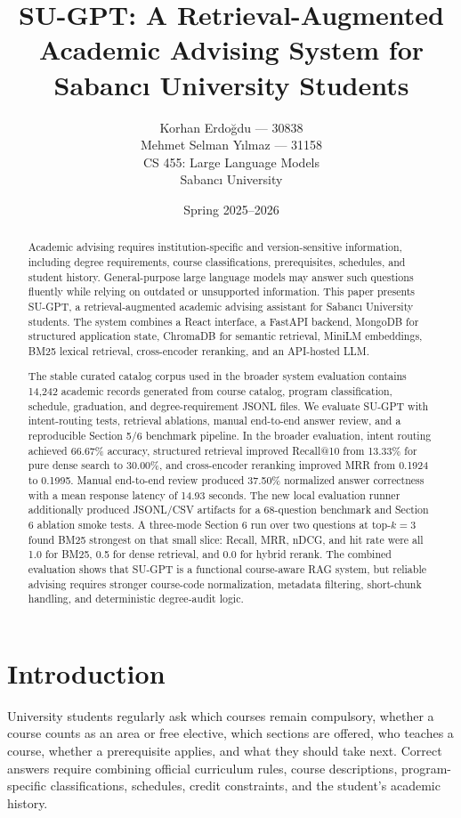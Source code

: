 \documentclass[10pt,a4paper]{article}
\title{\textbf{SU-GPT: A Retrieval-Augmented Academic Advising System for Sabancı University Students}}
\author{
    Korhan Erdoğdu --- 30838\\
    Mehmet Selman Yılmaz --- 31158\\[4pt]
    CS 455: Large Language Models\\
    Sabancı University
}
\date{Spring 2025--2026}
\begin{document}
\maketitle

\begin{abstract}
Academic advising requires institution-specific and version-sensitive information, including degree requirements, course classifications, prerequisites, schedules, and student history. General-purpose large language models may answer such questions fluently while relying on outdated or unsupported information. This paper presents SU-GPT, a retrieval-augmented academic advising assistant for Sabancı University students. The system combines a React interface, a FastAPI backend, MongoDB for structured application state, ChromaDB for semantic retrieval, MiniLM embeddings, BM25 lexical retrieval, cross-encoder reranking, and an API-hosted LLM.

The stable curated catalog corpus used in the broader system evaluation contains 14,242 academic records generated from course catalog, program classification, schedule, graduation, and degree-requirement JSONL files. We evaluate SU-GPT with intent-routing tests, retrieval ablations, manual end-to-end answer review, and a reproducible Section 5/6 benchmark pipeline. In the broader evaluation, intent routing achieved 66.67\% accuracy, structured retrieval improved Recall@10 from 13.33\% for pure dense search to 30.00\%, and cross-encoder reranking improved MRR from 0.1924 to 0.1995. Manual end-to-end review produced 37.50\% normalized answer correctness with a mean response latency of 14.93 seconds. The new local evaluation runner additionally produced JSONL/CSV artifacts for a 68-question benchmark and Section 6 ablation smoke tests. A three-mode Section 6 run over two questions at top-$k=3$ found BM25 strongest on that small slice: Recall, MRR, nDCG, and hit rate were all 1.0 for BM25, 0.5 for dense retrieval, and 0.0 for hybrid rerank. The combined evaluation shows that SU-GPT is a functional course-aware RAG system, but reliable advising requires stronger course-code normalization, metadata filtering, short-chunk handling, and deterministic degree-audit logic.
\end{abstract}

\section{Introduction}

University students regularly ask which courses remain compulsory, whether a course counts as an area or free elective, which sections are offered, who teaches a course, whether a prerequisite applies, and what they should take next. Correct answers require combining official curriculum rules, course descriptions, program-specific classifications, schedules, credit constraints, and the student's academic history.
\end{document}

